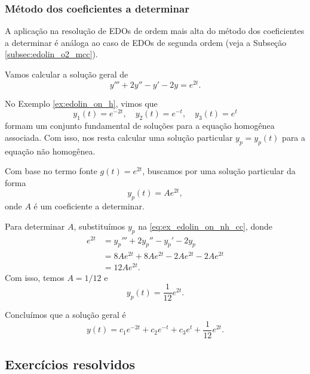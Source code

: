 \subsubsection{Método dos coeficientes a determinar}

A aplicação na resolução de EDOs de ordem mais alta do método dos coeficientes a determinar é análoga ao caso de EDOs de segunda ordem (veja a Subseção \ref{subsec:edolin_o2_mcc}).

\begin{ex}
  Vamos calcular a solução geral de
  \begin{equation}\label{eq:ex_edolin_on_nh_cc}
    y''' + 2y'' - y' - 2y = e^{2t}.
  \end{equation}

  No Exemplo \ref{ex:edolin_on_h}, vimos que
  \begin{equation}
    y_1(t) = e^{-2t},\quad y_2(t)=e^{-t},\quad y_3(t)=e^t
  \end{equation}
  formam um conjunto fundamental de soluções para a equação homogênea associada. Com isso, nos resta calcular uma solução particular $y_p=y_p(t)$ para a equação não homogênea.

  Com base no termo fonte $g(t) = e^{2t}$, buscamos por uma solução particular da forma
  \begin{equation}
    y_p(t) = Ae^{2t},
  \end{equation}
  onde $A$ é um coeficiente a determinar.

  Para determinar $A$, substituímos $y_p$ na \eqref{eq:ex_edolin_on_nh_cc}, donde
  \begin{align}
    e^{2t} &= y_p''' + 2y_p'' - y_p' - 2y_p \\
           &= 8Ae^{2t}+8Ae^{2t}-2Ae^{2t}-2Ae^{2t} \\
           &= 12Ae^{2t}.
  \end{align}
  Com isso, temos $A = 1/12$ e
  \begin{equation}
    y_p(t) = \frac{1}{12}e^{2t}.
  \end{equation}

  Concluímos que a solução geral é
  \begin{equation}
    y(t) = c_1e^{-2t} + c_2e^{-t} + c_3e^t + \frac{1}{12}e^{2t}.
  \end{equation}
\end{ex}


\subsection*{Exercícios resolvidos}

